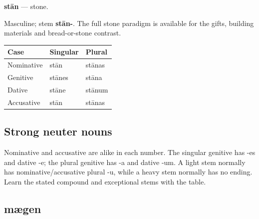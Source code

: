 \par\begin{minipage}{\linewidth}\raggedright
\textbf{stān} — stone.

Masculine; stem \textbf{stān-}. The full stone paradigm is available for the gifts, building materials and bread-or-stone contrast.

\par\begingroup
\fontsize{10.5}{13.2}\selectfont
\setlength{\LTleft}{0pt}\setlength{\LTright}{\fill}
\noindent
\begin{tabular}{@{}>{\raggedright\arraybackslash}p{39.46mm}>{\raggedright\arraybackslash}p{39.46mm}>{\raggedright\arraybackslash}p{39.46mm}@{}}
\toprule
\textbf{Case} & \textbf{Singular} & \textbf{Plural} \\
\midrule
Nominative & stān & stānas \\
Genitive & stānes & stāna \\
Dative & stāne & stānum \\
Accusative & stān & stānas \\
\bottomrule
\end{tabular}
\par\endgroup

\end{minipage}\par
{}
\subsection*{Strong neuter nouns}

Nominative and accusative are alike in each number. The singular genitive has -es and dative -e; the plural genitive has -a and dative -um. A light stem normally has nominative/\allowbreak{}accusative plural -u, while a heavy stem normally has no ending. Learn the stated compound and exceptional stems with the table.

\subsection*{mægen}

